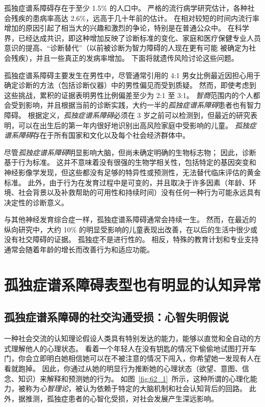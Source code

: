 孤独症谱系障碍存在于至少 1.5\% 的人口中。
严格的流行病学研究估计，各种社会残疾的患病率高达 2.6\%，远高于几十年前的估计。
在相对较短的时间内流行率增加的原因引起了相当大的兴趣和激烈的争论，特别是在普通公众中。
在科学界，已经达成共识，即这种增加反映了诊断标准的变化、家庭和医疗保健专业人员意识的提高、“诊断替代”（以前被诊断为智力障碍的人现在更有可能 被确定为社会残疾），并且一些真正的发病率增加。
下面将就遗传风险讨论这些问题。


孤独症谱系障碍主要发生在男性中，尽管通常引用的 4:1 男女比例最近因担心用于确定诊断的方法（包括诊断仪器）中的男性偏见而受到质疑。
然而，即使考虑到这些挑战，累积的证据表明男性比例偏差至少为 2:1 至 3:1。
\textit{智商}范围内的个人都会受到影响，并且根据当前的诊断实践，大约一半的\textit{孤独症谱系障碍}患者也有智力障碍。
根据定义，\textit{孤独症谱系障碍}必须在 3 岁之前可以检测到，但最近的研究表明，可以在出生后的第一年内很好地识别出高风险家庭中受影响的儿童。
\textit{孤独症谱系障碍}存在于所有国家和文化以及每个社会经济群体中。


尽管\textit{孤独症谱系障碍}明显影响大脑，但尚未确定明确的生物标志物；
因此，诊断基于行为标准。
这并不意味着没有很强的生物学相关性，包括特定的基因突变和神经影像学发现，但这些都没有足够的特异性或预测性，无法替代临床评估的黄金标准。
此外，由于行为在发育过程中是可变的，并且取决于许多因素（年龄、环境、社会背景以及补救帮助的可用性和持续时间）没有任何一种行为可能永远具有决定性的诊断意义。


与其他神经发育综合症一样，孤独症谱系障碍通常会持续一生。
然而，在最近的纵向研究中，大约 10\% 的明显受影响的儿童表现出改善，在以后的生活中很少或没有社交障碍的证据。
孤独症不是进行性的。
相反，特殊的教育计划和专业支持通常会随着年龄的增长而改善行为和适应功能。



\section{孤独症谱系障碍表型也有明显的认知异常}

\subsection{孤独症谱系障碍的社交沟通受损：心智失明假说}

一种社会交流的认知理论假设人类具有特别发达的能力，能够以直觉和全自动的方式理解他人的心理状态。
看着一个年轻人在没有钥匙的情况下偷偷地试图打开车门，你会立即明白她相信她可以在不被注意的情况下闯入，你希望她一发现有人在看就跑掉。
因此，你通过从她的明显行为推断她的心理状态（欲望、意图、信念、知识）来解释和预测她的行为。
如图~\ref{fig:62_1}~所示，这种所谓的心理化能力，被称为\textit{心智理论}，被认为依赖于特定的大脑机制和社会认知背后的回路。
此外，据推测，孤独症患者的心智化受损，对社会发展产生深远影响。


